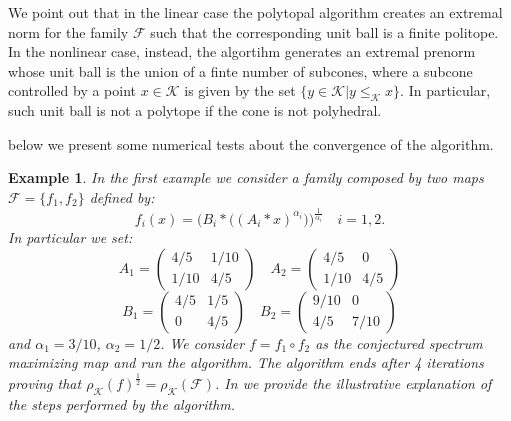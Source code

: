 \documentclass{article}
\newtheorem{example}[theorem]{Example}
\newcommand{\family}{\mathcal{F}}
\newcommand{\cradius}{\rho_{\cone}}
\newcommand{\cone}{\mathcal{K}}
\newcommand{\cleq}{\leq_{\cone}}
\begin{document}
%
We point out that in the linear case the polytopal algorithm creates an extremal norm for the family $\family$ such that the corresponding unit ball is a finite politope. In the nonlinear case, instead, the algortihm generates an extremal prenorm whose unit ball is the union of a finte number of subcones, where a subcone controlled by a point $x\in\cone$ is given by the set $\{y\in \cone| y\cleq x\}$.
In particular, such unit ball is not a polytope if the cone is not polyhedral.

%
below we present some numerical tests about the convergence of the algorithm.
%
\begin{example}
In the first example we consider a family composed by two maps $\family=\{f_1,f_2\}$ defined by:
%
\begin{equation}
f_i(x)=\Big(B_i*\big((A_i*x)^{\alpha_i}\big)\Big)^\frac{1}{\alpha_i} \quad i=1,2.
\end{equation}
%
In particular we set:
\begin{equation}
    A_1=\begin{pmatrix}
   4/5 & 1/10 \\ 1/10 & 4/5
\end{pmatrix} \quad A_2=\begin{pmatrix}
   4/5 & 0 \\ 1/10 & 4/5
\end{pmatrix}
\end{equation}
%
\begin{equation}
B_1=\begin{pmatrix}
   4/5 & 1/5 \\ 0 & 4/5
\end{pmatrix} \quad B_2=\begin{pmatrix}
   9/10 & 0 \\ 4/5 & 7/10
\end{pmatrix}    
\end{equation}
%
and $\alpha_1=3/10$, $\alpha_2=1/2$.
%
We consider $f=f_1\circ f_2$ as the conjectured spectrum maximizing map and run the algorithm. The algorithm ends after 4 iterations proving that $\cradius(f)^\frac{1}{2}=\cradius(\family)$. In  we provide the illustrative explanation of the steps performed by the algorithm.


\end{example}
\end{document}

